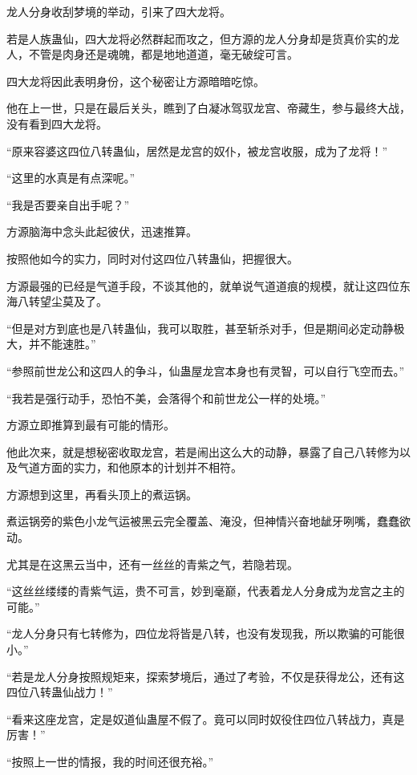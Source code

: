 
\begin{this_body}

龙人分身收刮梦境的举动，引来了四大龙将。

若是人族蛊仙，四大龙将必然群起而攻之，但方源的龙人分身却是货真价实的龙人，不管是肉身还是魂魄，都是地地道道，毫无破绽可言。

四大龙将因此表明身份，这个秘密让方源暗暗吃惊。

他在上一世，只是在最后关头，瞧到了白凝冰驾驭龙宫、帝藏生，参与最终大战，没有看到四大龙将。

“原来容婆这四位八转蛊仙，居然是龙宫的奴仆，被龙宫收服，成为了龙将！”

“这里的水真是有点深呢。”

“我是否要亲自出手呢？”

方源脑海中念头此起彼伏，迅速推算。

按照他如今的实力，同时对付这四位八转蛊仙，把握很大。

方源最强的已经是气道手段，不谈其他的，就单说气道道痕的规模，就让这四位东海八转望尘莫及了。

“但是对方到底也是八转蛊仙，我可以取胜，甚至斩杀对手，但是期间必定动静极大，并不能速胜。”

“参照前世龙公和这四人的争斗，仙蛊屋龙宫本身也有灵智，可以自行飞空而去。”

“我若是强行动手，恐怕不美，会落得个和前世龙公一样的处境。”

方源立即推算到最有可能的情形。

他此次来，就是想秘密收取龙宫，若是闹出这么大的动静，暴露了自己八转修为以及气道方面的实力，和他原本的计划并不相符。

方源想到这里，再看头顶上的煮运锅。

煮运锅旁的紫色小龙气运被黑云完全覆盖、淹没，但神情兴奋地龇牙咧嘴，蠢蠢欲动。

尤其是在这黑云当中，还有一丝丝的青紫之气，若隐若现。

“这丝丝缕缕的青紫气运，贵不可言，妙到毫巅，代表着龙人分身成为龙宫之主的可能。”

“龙人分身只有七转修为，四位龙将皆是八转，也没有发现我，所以欺骗的可能很小。”

“若是龙人分身按照规矩来，探索梦境后，通过了考验，不仅是获得龙公，还有这四位八转蛊仙战力！”

“看来这座龙宫，定是奴道仙蛊屋不假了。竟可以同时奴役住四位八转战力，真是厉害！”

“按照上一世的情报，我的时间还很充裕。”


\end{this_body}
